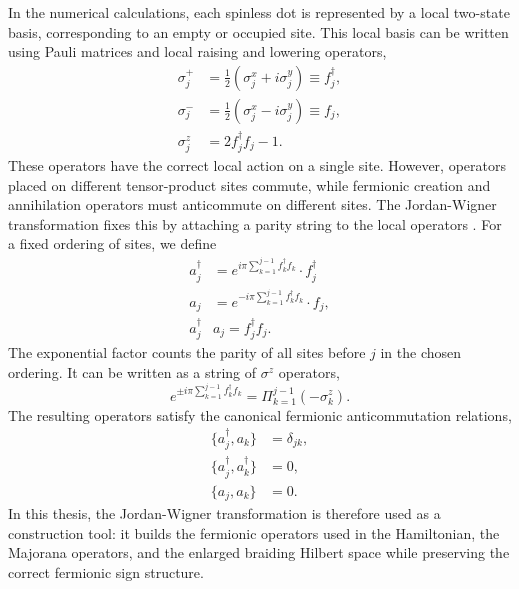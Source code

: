 In the numerical calculations, each spinless dot is represented by a local two-state basis, corresponding to an empty or occupied site. This local basis can be written using Pauli matrices and local raising and lowering operators,
\begin{align*}
\sigma_j^+ &= \frac{1}{2}(\sigma_j^x + i\sigma_j^y) \equiv f_j ^{†}, \\
\sigma_j^- &= \frac{1}{2}(\sigma_j^x - i\sigma_j^y) \equiv f_j, \\
\sigma_j^z &= 2f_j ^{†} f_j - 1.
\end{align*}
These operators have the correct local action on a single site. However, operators placed on different tensor-product sites commute, while fermionic creation and annihilation operators must anticommute on different sites. The Jordan-Wigner transformation fixes this by attaching a parity string to the local operators \cite{jordanBerPaulischeQuivalenzverbot1928,nielsen2005fermionic}. For a fixed ordering of sites, we define
\begin{align*}
  a_j^{†} &= e^{iπ∑_{k=1}^{j-1}f_k^{†}f_k } ⋅ f_j^{†} \\ 
  a_j &= e^{-iπ∑_{k=1}^{j-1}f_k^{†}f_k } ⋅ f_j, \\
  a_j^{†}&a_j = f_j^{†}f_j .
\end{align*}
The exponential factor counts the parity of all sites before $j$ in the chosen ordering. It can be written as a string of $\sigma^z$ operators,
\begin{equation}
  e^{±iπ∑_{k=1}^{j-1}f_k^{†}f_k } = Π_{k=1}^{j-1} (-\sigma_k^z).
\end{equation}
The resulting operators satisfy the canonical fermionic anticommutation relations,
\begin{align*}
\{a_j^{†}, a_k\} &= \delta_{jk}, \\
\{a_j^{†}, a_k^{†}\} &= 0, \\
\{a_j, a_k\} &= 0.
\end{align*}
In this thesis, the Jordan-Wigner transformation is therefore used as a construction tool: it builds the fermionic operators used in the Hamiltonian, the Majorana operators, and the enlarged braiding Hilbert space while preserving the correct fermionic sign structure.

